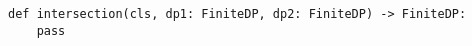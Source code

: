 \begin{verbatim}
def intersection(cls, dp1: FiniteDP, dp2: FiniteDP) -> FiniteDP:
    pass
\end{verbatim}